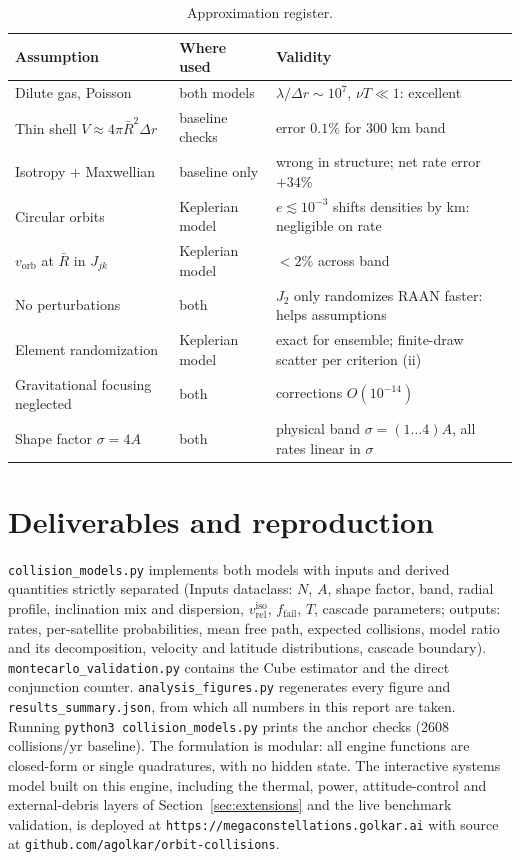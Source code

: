 \documentclass[11pt,a4paper]{article}
\newcommand{\vrel}{v_{\mathrm{rel}}}
\newcommand{\vorb}{v_{\mathrm{orb}}}
\newcommand{\Rbar}{\bar{R}}
\begin{document}
\begin{table}[h]\centering\small
\begin{tabular}{lll}
\toprule
Assumption & Where used & Validity \\
\midrule
Dilute gas, Poisson & both models & $\lambda/\Delta r \sim 10^{7}$, $\nu T \ll 1$: excellent \\
Thin shell $V \approx 4\pi\Rbar^2\Delta r$ & baseline checks & error $0.1\%$ for 300 km band \\
Isotropy + Maxwellian & baseline only & wrong in structure; net rate error $+34\%$ \\
Circular orbits & Keplerian model & $e \lesssim 10^{-3}$ shifts densities by km: negligible on rate \\
$\vorb$ at $\Rbar$ in $J_{jk}$ & Keplerian model & $<2\%$ across band \\
No perturbations & both & $J_2$ only randomizes RAAN faster: helps assumptions \\
Element randomization & Keplerian model & exact for ensemble; finite-draw scatter per criterion (ii) \\
Gravitational focusing neglected & both & corrections $O(10^{-14})$ \\
Shape factor $\sigma = 4A$ & both & physical band $\sigma = (1\ldots4)A$, all rates linear in $\sigma$ \\
\bottomrule
\end{tabular}
\caption{Approximation register.}
\end{table}

\section*{Deliverables and reproduction}

\texttt{collision\_models.py} implements both models with inputs and derived
quantities strictly separated (Inputs dataclass: $N$, $A$, shape factor, band,
radial profile, inclination mix and dispersion, $\vrel^{\mathrm{iso}}$,
$f_{\mathrm{fail}}$, $T$, cascade parameters; outputs: rates, per-satellite
probabilities, mean free path, expected collisions, model ratio and its
decomposition, velocity and latitude distributions, cascade boundary).
\texttt{montecarlo\_validation.py} contains the Cube estimator and the direct
conjunction counter. \texttt{analysis\_figures.py} regenerates every figure and
\texttt{results\_summary.json}, from which all numbers in this report are taken.
Running \texttt{python3 collision\_models.py} prints the anchor checks
(2608 collisions/yr baseline). The formulation is modular: all engine functions are
closed-form or single quadratures, with no hidden state. The interactive systems
model built on this engine, including the thermal, power, attitude-control and
external-debris layers of Section~\ref{sec:extensions} and the live benchmark
validation, is deployed at \texttt{https://megaconstellations.golkar.ai} with
source at \texttt{github.com/agolkar/orbit-collisions}.
\end{document}
